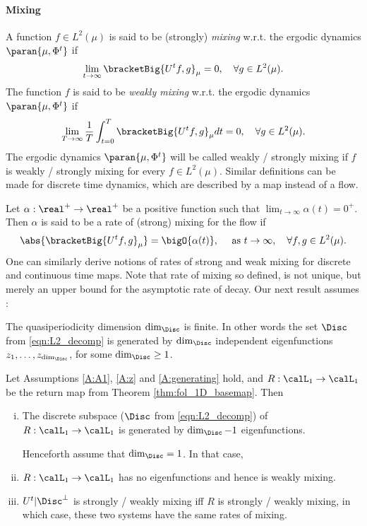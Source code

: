 \documentclass[12pt,oneside]{article}
\newcommand{\Return}{R}
\begin{document}
\paragraph{Mixing} A function $f\in L^2(\mu)$ is said to be (strongly) \emph{mixing} w.r.t. the ergodic dynamics $\paran{\mu, \Phi^t}$ if 
%
\[ \lim_{t\to\infty} \bracketBig{U^t f,g}_{\mu} = 0 , \quad \forall g\in L^2(\mu). \]
%
The function $f$ is said to be \emph{weakly mixing} w.r.t. the ergodic dynamics $\paran{\mu, \Phi^t}$ if 
%
\[ \lim_{T\to \infty} \frac{1}{T} \int_{t=0}^{T} \bracketBig{U^t f,g}_{\mu} dt = 0 , \quad \forall g\in L^2(\mu) . \]
%
The ergodic dynamics $\paran{\mu, \Phi^t}$ will be called weakly / strongly mixing if $f$ is weakly / strongly mixing for every $f\in L^2(\mu)$. Similar definitions can be made for discrete time dynamics, which are described by a map instead of a flow. 

Let $\alpha:\real^+ \to \real^+$ be a positive function such that $\lim_{t\to\infty} \alpha(t) = 0^+$. Then $\alpha$ is said to be a rate of (strong) mixing for the flow if
%
\[ \abs{ \bracketBig{U^tf, g}_{\mu} } = \bigO{ \alpha(t) }, \quad \mbox{ as } t\to\infty, \quad \forall f,g\in L^2(\mu). \] 
%
One can similarly derive notions of rates of strong and weak mixing for discrete and continuous time maps. Note that rate of mixing so defined, is not unique, but merely an upper bound for the asymptotic rate of decay. Our next result assumes :

\begin{Assumption}\label{A:generating}
The quasiperiodicity dimension $\dim_{\Disc}$ is finite. In other words the set $\Disc$ from \eqref{eqn:L2_decomp} is generated by $\dim_{\Disc}$ independent eigenfunctions $z_1,\ldots,z_{\dim_{\Disc}}$, for some $\dim_{\Disc}\geq 1$.
\end{Assumption}

\begin{theorem} \label{thm:fol_1D_return}
Let Assumptions \ref{A:A1}, \ref{A:z} and \ref{A:generating} hold, and  $\Return : \calL_1 \to \calL_1$ be the return map from Theorem \ref{thm:fol_1D_basemap}. Then
\begin{enumerate}[(i)]
	\item The discrete subspace ($\Disc$ from  \ref{eqn:L2_decomp}) of $\Return : \calL_1 \to \calL_1$ is generated by $\dim_{\Disc}-1$ eigenfunctions.
	
	Henceforth assume that $\dim_{\Disc}=1$. In that case,
	\item $\Return :  \calL_1 \to \calL_1$ has no eigenfunctions and hence is weakly mixing.
	\item $U^t | \Disc^\bot$ is strongly / weakly mixing iff $\Return$ is strongly / weakly mixing, in which case, these two systems have the same rates of mixing.
\end{enumerate}
\end{theorem}
\end{document}
